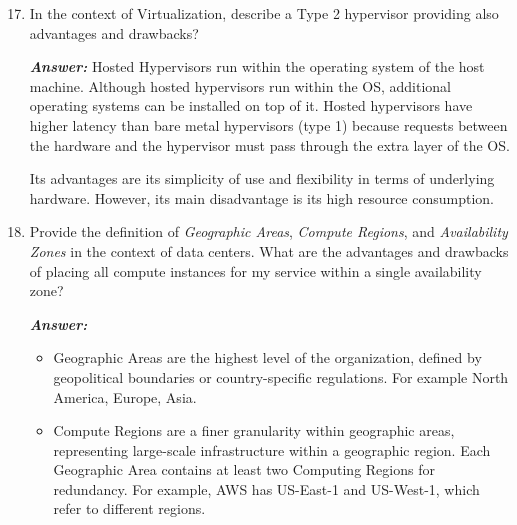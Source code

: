 \begin{enumerate}
    \setcounter{enumi}{16}

    \item In the context of Virtualization, describe a Type 2 hypervisor providing also advantages and drawbacks?

    \textcolor{Green3}{\textbf{\emph{Answer:}}} Hosted Hypervisors run within the operating system of the host machine. Although hosted hypervisors run within the OS, additional operating systems can be installed on top of it. Hosted hypervisors have higher latency than bare metal hypervisors (type 1) because requests between the hardware and the hypervisor must pass through the extra layer of the OS.

    \highspace
    Its advantages are its simplicity of use and flexibility in terms of underlying hardware. However, its main disadvantage is its high resource consumption.


    \item Provide the definition of \emph{Geographic Areas}, \emph{Compute Regions}, and \emph{Availability Zones} in the context of data centers. What are the advantages and drawbacks of placing all compute instances for my service within a single availability zone?

    \textcolor{Green3}{\textbf{\emph{Answer:}}}
    \begin{itemize}
        \item Geographic Areas are the highest level of the organization, defined by geopolitical boundaries or country-specific regulations. For example North America, Europe, Asia.
        
        \item Compute Regions are a finer granularity within geographic areas, representing large-scale infrastructure within a geographic region. Each Geographic Area contains at least two Computing Regions for redundancy. For example, AWS has US-East-1 and US-West-1, which refer to different regions.
        

\end{itemize}
\end{enumerate}
